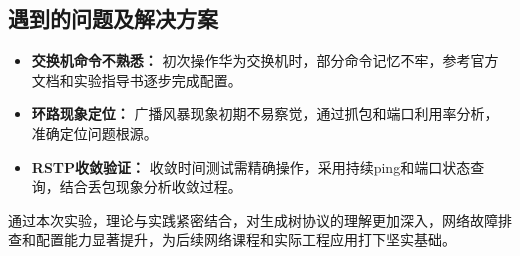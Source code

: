 \documentclass[a4paper]{article}
\begin{document}
\subsection{遇到的问题及解决方案}
\begin{itemize}
    \item \textbf{交换机命令不熟悉：} 初次操作华为交换机时，部分命令记忆不牢，参考官方文档和实验指导书逐步完成配置。
    \item \textbf{环路现象定位：} 广播风暴现象初期不易察觉，通过抓包和端口利用率分析，准确定位问题根源。
    \item \textbf{RSTP收敛验证：} 收敛时间测试需精确操作，采用持续ping和端口状态查询，结合丢包现象分析收敛过程。
\end{itemize}
通过本次实验，理论与实践紧密结合，对生成树协议的理解更加深入，网络故障排查和配置能力显著提升，为后续网络课程和实际工程应用打下坚实基础。
\end{document}
